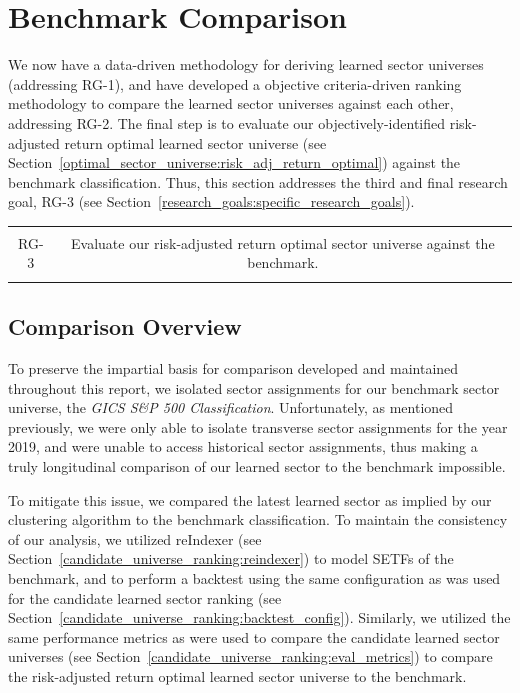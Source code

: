 \documentclass[../main.tex]{subfiles}
\begin{document}
\chapter{Benchmark Comparison} \label{benchmark_comparison}

We now have a data-driven methodology for deriving learned sector universes (addressing RG-1), and have developed a objective criteria-driven ranking methodology to compare the learned sector universes against each other, addressing RG-2. The final step is to evaluate our objectively-identified risk-adjusted return optimal learned sector universe (see Section~\ref{optimal_sector_universe:risk_adj_return_optimal}) against the benchmark classification. Thus, this section addresses the third and final research goal, RG-3 (see Section~\ref{research_goals:specific_research_goals}).

\begin{table}[h!]
    \centering
    \begin{tabular}{| c | c |}
        \hline
        &  \\
        RG-3 & Evaluate our risk-adjusted return optimal sector universe against the benchmark. \\
        & \\
        \hline
    \end{tabular}
\end{table}

\section{Comparison Overview}

To preserve the impartial basis for comparison developed and maintained throughout this report, we isolated sector assignments for our benchmark sector universe, the \textit{GICS S\&P 500 Classification}. Unfortunately, as mentioned previously, we were only able to isolate transverse sector assignments for the year 2019, and were unable to access historical sector assignments, thus making a truly longitudinal comparison of our learned sector to the benchmark impossible.

To mitigate this issue, we compared the latest learned sector as implied by our clustering algorithm to the benchmark classification. To maintain the consistency of our analysis, we utilized reIndexer (see Section~\ref{candidate_universe_ranking:reindexer}) to model SETFs of the benchmark, and to perform a backtest using the same configuration as was used for the candidate learned sector ranking (see Section~\ref{candidate_universe_ranking:backtest_config}). Similarly, we utilized the same performance metrics as were used to compare the candidate learned sector universes (see Section~\ref{candidate_universe_ranking:eval_metrics}) to compare the risk-adjusted return optimal learned sector universe to the benchmark.
\end{document}
